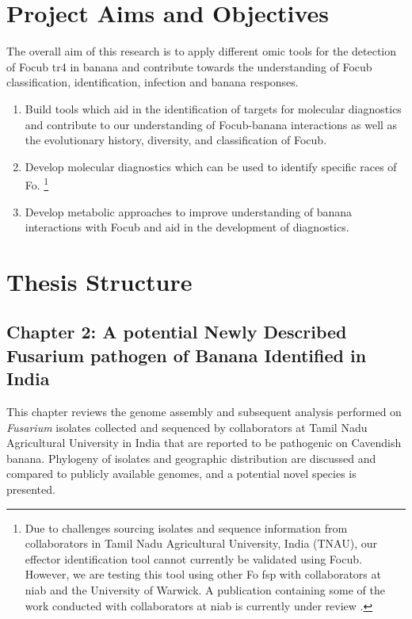 \newpage
\section{Project Aims and Objectives}

The overall aim of this research is to apply different omic tools for the detection of \acl{Focub} \ac{tr4} in banana and contribute towards the understanding of \acl{Focub} classification, identification, infection and banana responses. 

\begin{enumerate}
    \item Build tools which aid in the identification of targets for molecular diagnostics and contribute to our understanding of \ac{Focub}-banana interactions as well as the evolutionary history, diversity, and classification of \ac{Focub}. 
    \item Develop molecular diagnostics which can be used to identify specific races of \acl{Fo}. \footnote{Due to challenges sourcing isolates and sequence information from collaborators in Tamil Nadu Agricultural University, India (TNAU), our effector identification tool cannot currently be validated using \ac{Focub}. However, we are testing this tool using other \acl{Fo} \ac{fsp} with collaborators at \acl{niab} and the University of Warwick. A publication containing some of the work conducted with collaborators at \acl{niab} is currently under review \parencite{FolaManuscript}.} 
    \item Develop metabolic approaches to improve understanding of banana interactions with \ac{Focub} and aid in the development of diagnostics.
\end{enumerate}

\newpage
\section{Thesis Structure}

\subsection{Chapter 2: A potential Newly Described Fusarium pathogen of Banana Identified in India} 

This chapter reviews the genome assembly and subsequent analysis performed on \textit{Fusarium} isolates collected and sequenced by collaborators at Tamil Nadu Agricultural University in India that are reported to be pathogenic on Cavendish banana. Phylogeny of isolates and geographic distribution are discussed and compared to publicly available genomes, and a potential novel species is presented. 

